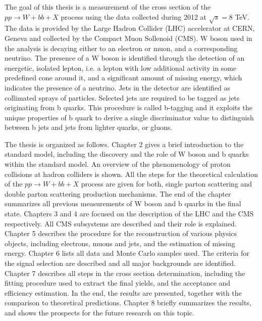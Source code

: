 \par The goal of this thesis is a measurement of the cross section of the $pp\rightarrow W+bb+X$ process using the data collected during 2012 at $\sqrt{s} = 8$ TeV. The data is provided by the Large Hadron Collider (LHC) accelerator at CERN, Geneva and collected by the Compact Muon Sollenoid (CMS). W boson used in the analysis is decaying either to an electron or muon, and a corresponding neutrino. The presence of a W boson is identified through the detection of an energetic, isolated lepton, i.e. a lepton with low additional activity in some predefined cone around it, and a significant amount of missing energy, which indicates the presence of a neutrino. Jets in the detector are identified as collimated sprays of particles. Selected jets are required to be tagged as jets originating from b quarks. This procedure is called b-tagging and it exploits the unique properties of b quark to derive a single discriminator value to distinguish between b jets and jets from lighter quarks, or gluons. 

The thesis is organized as follows. Chapter 2 gives a brief introduction to the standard model, including the discovery and the role of W boson and b quarks within the standard model. An overview of the phenomenology of proton collisions at hadron colliders is shown. All the steps for the theoretical calculation of the $pp\rightarrow W+bb+X$ process are given for both, single parton scattering and double parton scattering production mechanisms. The end of the chapter summarizes all previous measurements of W boson and b quarks in the final state. Chapters 3 and 4 are focused on the description of the LHC and the CMS respectively. All CMS subsystems are described and their role is explained. Chapter 5 describes the procedure for the reconstruction of various physics objects, including electrons, muons and jets, and the estimation of missing energy. Chapter 6 lists all data and Monte Carlo samples used. The criteria for the signal selection are described and all major backgrounds are identified. Chapter 7 describes all steps in the cross section determination, including the fitting procedure used to extract the final yields, and the acceptance and efficiency estimation. In the end, the results are presented, together with the comparison to theoretical predictions. Chapter 8 briefly summarizes the results, and shows the prospects for the future research on this topic.
